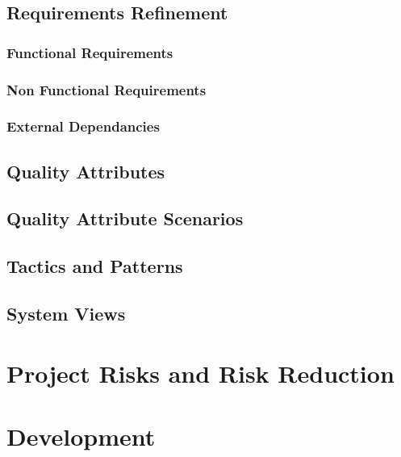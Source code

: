 \documentclass[10pt,a4paper]{article}
\begin{document}
\subsection{Requirements Refinement}
\label{sec:requirements}

\subsubsection{Functional Requirements}
\label{sec:functional_requirements}

\subsubsection{Non Functional Requirements}
\label{sec:nonfunctional_requirements}

\subsubsection{External Dependancies}
 \label{sec:external_dependancies}

\subsection{Quality Attributes}
\label{sec:qualities}

\subsection{Quality Attribute Scenarios}
\label{sec:scenarios}

\subsection{Tactics and Patterns}
\label{sec:tactics}

\subsection{System Views}
\label{sec:views}

\section{Project Risks and Risk Reduction}
\label{sec:risks}

\section{Development}
\label{sec:development}
\end{document}
